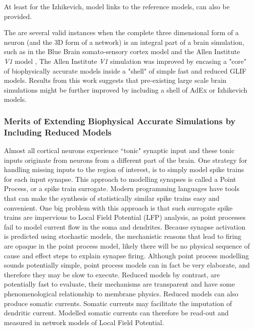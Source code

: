 At least for the Izhikevich, model links to the reference models, can also be provided.

The are several valid instances when the complete three dimensional form of a neuron (and the 3D form of a network) is an integral part of a brain simulation, such as in the Blue Brain somato-sensory cortex model \cite{markram2006blue} and the Allen Institute \emph{V1} model \cite{billeh2020systematic}, The Allen Institute \emph{V1} simulation was improved by encasing a "core" of biophysically accurate models inside a "shell" of simple fast and reduced GLIF models. Results from this work suggests that pre-existing large scale brain simulations might be further improved by including a shell of AdEx or Izhikevich models.%


\subsubsection{Merits of Extending Biophysical Accurate Simulations by Including Reduced Models}
Almost all cortical neurons experience ``tonic" synaptic input and these tonic inputs originate from neurons from a different part of the brain. One strategy for handling missing inputs to the region of interest, is to simply model spike trains for each input synapse. This approach to modelling synapses is called a Point Process, or a spike train surrogate. Modern programming languages have tools that can make the synthesis of statistically similar spike trains easy and convenient. One big problem with this approach is that such surrogate spike trains are impervious to Local Field Potential (LFP) analysis, as point processes fail to model current flow in the soma and dendrites. Because synapse activation is predicted using stochastic models, the mechanistic reasons that lead to firing are opaque in the point process model, likely there will be no physical sequence of cause and effect steps to explain synapse firing. Although point process modelling sounds potentially simple, point process models can in fact be very elaborate, and therefore they may be slow to execute. Reduced models by contrast, are potentially fast to evaluate, their mechanisms are transparent and have some phenomenological relationship to membrane physics. Reduced models can also produce somatic currents. Somatic currents may facilitate the imputation of dendritic current. Modelled somatic currents can therefore be read-out and measured in network models of Local Field Potential.

